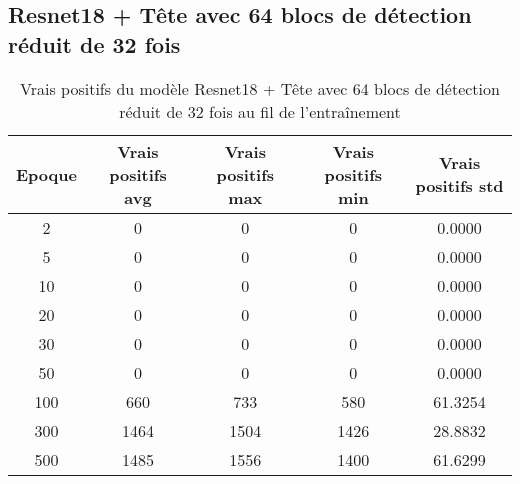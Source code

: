 
\clearpage
\subsection{Resnet18 + Tête avec 64 blocs de détection réduit de 32 fois}

\begin{table}[!ht]
    \caption{Vrais positifs du modèle Resnet18 + Tête avec 64 blocs de détection réduit de 32 fois au fil de l'entraînement}
    \label{tab:resnet18+head_64n_true_positive_reduced_32x_precision}
    \centering
    \begin{tabular}{ |c||c|c|c|c|  }
        \hline
        \rowcolor{gray!50}
        Epoque & Vrais positifs avg & Vrais positifs max & Vrais positifs min & Vrais positifs std\\
        \hline
        2 & 0 & 0 & 0 & 0.0000\\
        5 & 0 & 0 & 0 & 0.0000\\
        10 & 0 & 0 & 0 & 0.0000\\
        20 & 0 & 0 & 0 & 0.0000\\
        30 & 0 & 0 & 0 & 0.0000\\
        50 & 0 & 0 & 0 & 0.0000\\
        100 & 660 & 733 & 580 & 61.3254\\
        300 & 1464 & 1504 & 1426 & 28.8832\\
        500 & 1485 & 1556 & 1400 & 61.6299\\
        \hline
    \end{tabular}
\end{table}

